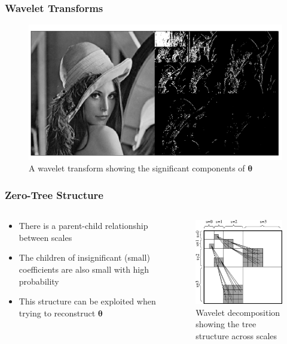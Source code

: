\documentclass{beamer}
\newcommand{\bftheta}{\mathbf{\theta}}
\begin{document}
\begin{frame}
  \frametitle{Wavelet Transforms}

  \begin{figure}[]
    \centering
    \includegraphics[width=12cm]{lenna_wavelet}
    \caption{A wavelet transform showing the significant components of $\bftheta$}
    \label{fig:lenna}
  \end{figure}
  
\end{frame}

\begin{frame}
  \frametitle{Zero-Tree Structure}
\begin{columns}
  \begin{column}{.5\linewidth}
    \begin{itemize}
      \setlength{\itemsep}{15pt}
    \item There is a parent-child relationship between scales
    \item The children of insignificant (small) coefficients are also small with high probability
    \item This structure can be exploited when trying to reconstruct $\bftheta$
      \end{itemize}    
    \end{column}
    \begin{column}{.5\linewidth}
      \begin{figure}[h!]
        \centering
        \includegraphics[width=5cm]{wavelet_tree}
        \caption{Wavelet decomposition showing the tree structure across scales}
        \label{fig:wavelet_tree}
      \end{figure}
    \end{column}
  \end{columns} 
\end{frame}
\end{document}
